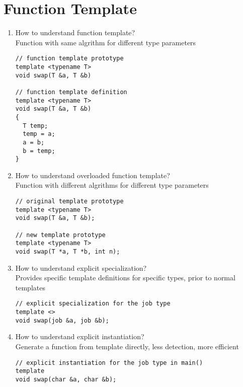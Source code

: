\documentclass[10pt,a4paper,oneside]{article}
\begin{document}
\section{Function Template}
\begin{enumerate}[1.]
\item How to understand function template?\\
Function with same algrithm for different type parameters
\begin{lstlisting}
// function template prototype
template <typename T>
void swap(T &a, T &b)

// function template definition
template <typename T>
void swap(T &a, T &b)
{
  T temp;
  temp = a;
  a = b;
  b = temp;
}
\end{lstlisting}
\item How to understand overloaded function template?\\
Function with different algrithms for different type parameters
\begin{lstlisting}
// original template prototype
template <typename T>
void swap(T &a, T &b);

// new template prototype
template <typename T>
void swap(T *a, T *b, int n);

\end{lstlisting}
\item How to understand explicit specialization?\\
Provides specific template definitions for specific types, prior to normal templates
\begin{lstlisting}
// explicit specialization for the job type
template <>
void swap(job &a, job &b);

\end{lstlisting}
\item How to understand explicit instantiation?\\
Generate a function from template directly, less detection, more efficient
\begin{lstlisting}
// explicit instantiation for the job type in main()
template 
void swap(char &a, char &b);

\end{lstlisting}
\end{enumerate}
\end{document}
